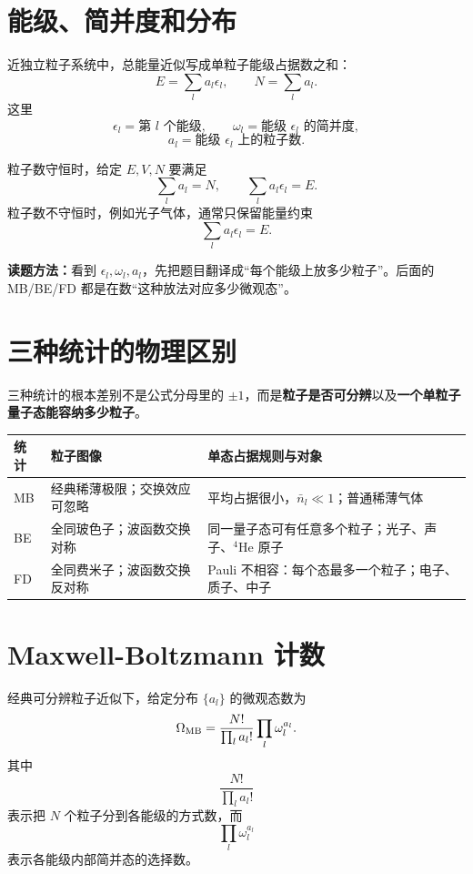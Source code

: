 \section{能级、简并度和分布}

近独立粒子系统中，总能量近似写成单粒子能级占据数之和：
\[
  E=\sum_l a_l\epsilon_l,\qquad N=\sum_l a_l .
\]
这里
\[
  \epsilon_l = \text{第 }l\text{ 个能级},\qquad
  \omega_l = \text{能级 }\epsilon_l\text{ 的简并度},
\]
\[
  a_l = \text{能级 }\epsilon_l\text{ 上的粒子数}.
\]

粒子数守恒时，给定 $E,V,N$ 要满足
\[
  \sum_l a_l=N,\qquad
  \sum_l a_l\epsilon_l=E.
\]
粒子数不守恒时，例如光子气体，通常只保留能量约束
\[
  \sum_l a_l\epsilon_l=E.
\]

\begin{keybox}
\textbf{读题方法：}看到 $\epsilon_l,\omega_l,a_l$，先把题目翻译成“每个能级上放多少粒子”。后面的 MB/BE/FD 都是在数“这种放法对应多少微观态”。
\end{keybox}

\section{三种统计的物理区别}

三种统计的根本差别不是公式分母里的 $\pm 1$，而是\textbf{粒子是否可分辨}以及\textbf{一个单粒子量子态能容纳多少粒子}。

\begin{center}
\small
\begin{tabular}{p{} p{} p{}}
\toprule
统计 & 粒子图像 & 单态占据规则与对象 \\
\midrule
MB & 经典稀薄极限；交换效应可忽略 & 平均占据很小，$\bar n_l\ll 1$；普通稀薄气体 \\
BE & 全同玻色子；波函数交换对称 & 同一量子态可有任意多个粒子；光子、声子、$^4$He 原子 \\
FD & 全同费米子；波函数交换反对称 & Pauli 不相容：每个态最多一个粒子；电子、质子、中子 \\
\bottomrule
\end{tabular}
\end{center}

\section{Maxwell-Boltzmann 计数}

经典可分辨粒子近似下，给定分布 $\{a_l\}$ 的微观态数为
\[
  \Omega_{\rm MB}
  =\frac{N!}{\prod_l a_l!}\prod_l \omega_l^{a_l}.
\]
其中
\[
  \frac{N!}{\prod_l a_l!}
\]
表示把 $N$ 个粒子分到各能级的方式数，而
\[
  \prod_l \omega_l^{a_l}
\]
表示各能级内部简并态的选择数。

